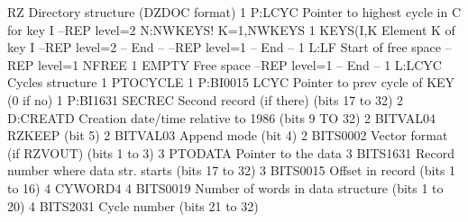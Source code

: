 \begin{XMPt}{RZ Directory structure (DZDOC format)}
     1       P:LCYC   Pointer to highest cycle in C for key I                   
   --REP level=2  N:NWKEYS! K=1,NWKEYS                                          
         1     KEYS(I,K Element K of key I                                      
   --REP level=2 -- End --                                                      
 --REP level=1 -- End --                                                        
 1         L:LF     Start of free space                                         
 --REP level=1  NFREE                                                           
     1       EMPTY    Free space                                                
 --REP level=1 -- End --                                                        
 1         L:LCYC   Cycles structure                                            
 1         PTOCYCLE                                                             
 1         P:BI0015 LCYC Pointer to prev cycle of KEY (0 if no)                 
 1         P:BI1631 SECREC Second record (if there) (bits 17 to 32)             
 2         D:CREATD Creation date/time relative to 1986 (bits 9 TO 32)          
 2         BITVAL04 RZKEEP (bit 5)                                              
 2         BITVAL03 Append mode (bit 4)                                         
 2         BITS0002 Vector format (if RZVOUT) (bits 1 to 3)                     
 3         PTODATA  Pointer to the data                                         
 3         BITS1631 Record number where data str. starts (bits 17 to 32)        
 3         BITS0015 Offset in record (bits 1 to 16)                             
 4         CYWORD4                                                              
 4         BITS0019 Number of words in data structure (bits 1 to 20)            
 4         BITS2031 Cycle number (bits 21 to 32)                                
\end{XMPt}

